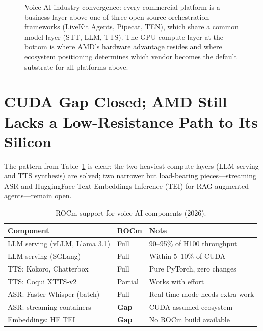 \documentclass[blind]{gtac}
\begin{document}
\begin{figure}[H]
\caption{Voice AI industry convergence: every commercial platform is a business layer
  above one of three open-source orchestration frameworks (LiveKit Agents, Pipecat, TEN),
  which share a common model layer (STT, LLM, TTS). The GPU compute layer at the bottom
  is where AMD's hardware advantage resides and where ecosystem positioning determines
  which vendor becomes the default substrate for all platforms above.}
\label{fig:convergence}
\end{figure}

\section{CUDA Gap Closed; AMD Still Lacks a Low-Resistance Path to Its Silicon}
\label{sec:amd_today}

The pattern from Table~\ref{tab:compat} is clear: the two heaviest compute layers (LLM serving and TTS synthesis) are solved; two narrower but load-bearing pieces---streaming ASR and HuggingFace Text Embeddings Inference (TEI) for RAG-augmented agents---remain open.

\begin{table}[H]
\centering
\tiny
\caption{ROCm support for voice-AI components (2026).}
\label{tab:compat}
\begin{tabular}{@{}lll@{}}
\toprule
Component & ROCm & Note \\
\midrule
LLM serving (vLLM, Llama 3.1) & Full & 90--95\% of H100 throughput \\
LLM serving (SGLang) & Full & Within 5--10\% of CUDA \\
TTS: Kokoro, Chatterbox & Full & Pure PyTorch, zero changes \\
TTS: Coqui XTTS-v2 & Partial & Works with effort \\
ASR: Faster-Whisper (batch) & Full & Real-time mode needs extra work \\
ASR: streaming containers & \textbf{Gap} & CUDA-assumed ecosystem \\
Embeddings: HF TEI & \textbf{Gap} & No ROCm build available \\
\bottomrule
\end{tabular}
\end{table}
\end{document}
